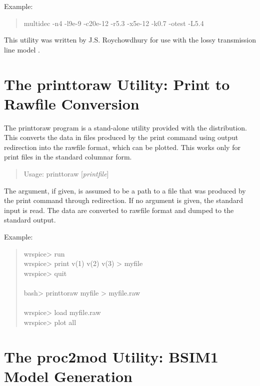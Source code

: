 Example:
\begin{quote}
{\vt multidec -n4 -l9e-9 -c20e-12 -r5.3 -x5e-12 -k0.7 -otest -L5.4}
\end{quote}

This utility was written by J.S.  Roychowdhury for use with the lossy
transmission line model \cite{ltra}.


\section{The {\vt printtoraw} Utility: Print to Rawfile Conversion}


The {\vt printtoraw} program is a stand-alone utility provided with
the {\WRspice} distribution.  This converts the data in files produced
by the {\et print} command using output redirection into the rawfile
format, which can be plotted.  This works only for print files in the
standard columnar form.

\begin{quote}
Usage: {\vt printtoraw} [{\it printfile\/}]
\end{quote}

The argument, if given, is assumed to be a path to a file that was
produced by the {\WRspice} {\et print} command through redirection. 
If no argument is given, the standard input is read.  The data are
converted to rawfile format and dumped to the standard output.

Example:
\begin{quote}
{\vt wrspice> run}\\
{\vt wrspice> print v(1) v(2) v(3) > myfile}\\
{\vt wrspice> quit}\\
\\
{\vt bash> printtoraw myfile > myfile.raw}\\
\\
{\vt wrspice> load myfile.raw}\\
{\vt wrspice> plot all}
\end{quote}


\section{The {\vt proc2mod} Utility: BSIM1 Model Generation}

